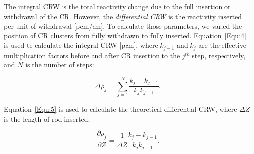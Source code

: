 The integral CRW is the total reactivity change due to the full 
insertion or withdrawal of the CR. However, the \textit{differential CRW} is the
reactivity inserted per unit of withdrawal [pcm/cm]. To calculate those 
parameters, we varied the position of CR clusters from fully withdrawn to 
fully inserted. Equation~\ref{Equ:4} is used to calculate the integral CRW 
[pcm], where $k_{j-1}$ and $k_{j}$ are the effective multiplication factors 
before and after CR insertion to the $j$$^{th}$ step, respectively, and $N$ is the number of steps:

\begin{equation}
\label{Equ:4}
{{\Delta}{\rho}_{j}}=\sum_{j=1}^{N}\dfrac{{k_{j}}-{k_{j-1}}}{{{k_{j}}{k_{j-1}}}}.
\end{equation}

Equation~\ref{Equ:5} is used to calculate the theoretical differential CRW, where 
$\Delta Z$ is the length of rod inserted:

\begin{equation}
\label{Equ:5}
\dfrac{{\partial}{\rho}_{j}}{{\partial{Z}}}=\dfrac{1}{{\Delta}{Z}}\dfrac{{k_{j}}-{k_{j-1}}}{{{k_{j}}{k_{j-1}}}}.
\end{equation}


